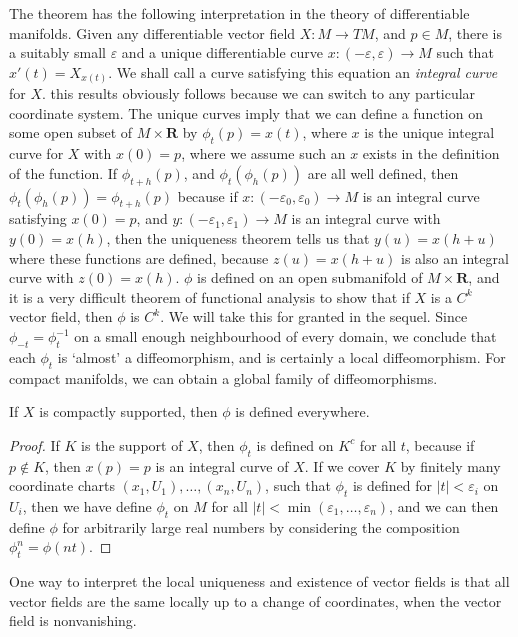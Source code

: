 The theorem has the following interpretation in the theory of differentiable manifolds. Given any differentiable vector field $X: M \to TM$, and $p \in M$, there is a suitably small $\varepsilon$ and a unique differentiable curve $x: (-\varepsilon,\varepsilon) \to M$ such that $x'(t) = X_{x(t)}$. We shall call a curve satisfying this equation an \emph{integral curve} for $X$. this results obviously follows because we can switch to any particular coordinate system. The unique curves imply that we can define a function on some open subset of $M \times \mathbf{R}$ by $\phi_t(p) = x(t)$, where $x$ is the unique integral curve for $X$ with $x(0) = p$, where we assume such an $x$ exists in the definition of the function. If $\phi_{t+h}(p)$, and $\phi_t(\phi_h(p))$ are all well defined, then $\phi_t(\phi_h(p)) = \phi_{t + h}(p)$ because if $x: (-\varepsilon_0,\varepsilon_0) \to M$ is an integral curve satisfying $x(0) = p$, and $y: (-\varepsilon_1, \varepsilon_1) \to M$ is an integral curve with $y(0) = x(h)$, then the uniqueness theorem tells us that $y(u) = x(h + u)$ where these functions are defined, because $z(u) = x(h + u)$ is also an integral curve with $z(0) = x(h)$. $\phi$ is defined on an open submanifold of $M \times \mathbf{R}$, and it is a very difficult theorem of functional analysis to show that if $X$ is a $C^k$ vector field, then $\phi$ is $C^k$. We will take this for granted in the sequel. Since $\phi_{-t} = \phi_t^{-1}$ on a small enough neighbourhood of every domain, we conclude that each $\phi_t$ is `almost' a diffeomorphism, and is certainly a local diffeomorphism. For compact manifolds, we can obtain a global family of diffeomorphisms.

\begin{theorem}
    If $X$ is compactly supported, then $\phi$ is defined everywhere.
\end{theorem}
\begin{proof}
    If $K$ is the support of $X$, then $\phi_t$ is defined on $K^c$ for all $t$, because if $p \not \in K$, then $x(p) = p$ is an integral curve of $X$. If we cover $K$ by finitely many coordinate charts $(x_1,U_1), \dots, (x_n,U_n)$, such that $\phi_t$ is defined for $|t| < \varepsilon_i$ on $U_i$, then we have define $\phi_t$ on $M$ for all $|t| < \min(\varepsilon_1, \dots, \varepsilon_n)$, and we can then define $\phi$ for arbitrarily large real numbers by considering the composition $\phi^n_t = \phi(nt)$.
\end{proof}

One way to interpret the local uniqueness and existence of vector fields is that all vector fields are the same locally up to a change of coordinates, when the vector field is nonvanishing.

